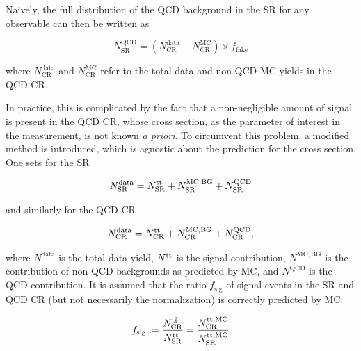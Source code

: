 Naively, the full distribution of the QCD background in the SR for any observable can then be written as

\begin{equation}
\label{eq:ttxs:abcd_naive}
    N_{\text{SR}}^{\text{QCD}} = ( N_{\text{CR}}^{\text{data}} - N_{\text{CR}}^{\text{MC}} ) \times f_{\mathrm{fake}}
\end{equation}

\noindent where $N_{\text{CR}}^{\text{data}}$ and $N_{\text{CR}}^{\text{MC}}$ refer to the total data and non-QCD MC yields in the QCD CR.

In practice, this is complicated by the fact that a non-negligible amount of \ttbar signal is present in the QCD CR, whose cross section, as the parameter of interest in the measurement, is not known \textit{a priori}. %
To circumvent this problem, a modified method is introduced, which is agnostic about the prediction for the \ttbar cross section. 
One sets for the SR

\begin{equation}
\label{eq:ttxs:abcd_modified1}
    N^{\mathrm{data}}_{\mathrm{SR}} = N^{\mathrm{t \bar{t}}}_{\mathrm{SR}}+ N^{\mathrm{MC,BG}}_{\mathrm{SR}} + N^{\mathrm{QCD}}_{\mathrm{SR}}
\end{equation}

\noindent and similarly for the QCD CR

\begin{equation}
\label{eq:ttxs:abcd_modified2}
    N^{\mathrm{data}}_{\mathrm{CR}} = N^{\mathrm{t \bar{t}}}_{\mathrm{CR}} + N^{\mathrm{MC,BG}}_{\mathrm{CR}} + N^{\mathrm{QCD}}_{\mathrm{CR}},
\end{equation}

\noindent where $N^{\mathrm{data}}$ is the total data yield, $N^{\mathrm{t \bar{t}}}$ is the \ttbar signal contribution, $N^{\mathrm{MC,BG}}$ is the contribution of non-QCD backgrounds as predicted by MC, and $N^{\mathrm{QCD}}$ is the QCD contribution. It is assumed that the ratio $f_{\mathrm{sig}}$ of signal events in the SR and QCD CR (but not necessarily the normalization) is correctly predicted by MC:

\begin{equation}
\label{eq:ttxs:abcd_modified3}
    f_{\mathrm{sig}} := \frac{ N^{\mathrm{t \bar{t}}}_{\mathrm{CR}} }{ N^{\mathrm{t \bar{t}}}_{\mathrm{SR}} } = \frac{ N^{\mathrm{\mathrm{t \bar{t}},MC}}_{\mathrm{CR}} }{ N^{\mathrm{\mathrm{t \bar{t}},MC}}_{\mathrm{SR}} }
\end{equation}

